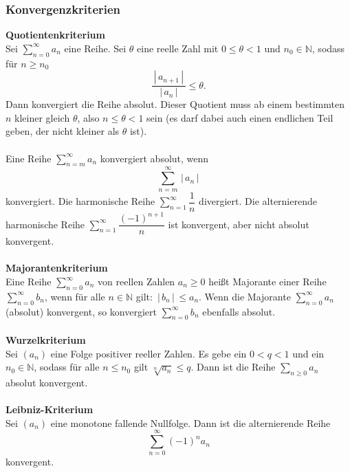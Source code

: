 \documentclass[a4paper,12pt]{article}
\numberwithin{equation}{section}
\begin{document}
\subsubsection{Konvergenzkriterien}
\textbf{Quotientenkriterium}\\ 
Sei $\sum_{n=0}^{\infty}a_n$ eine Reihe. Sei $\theta $ eine reelle Zahl mit $0\leq \theta <1$ und $n_0 \in \mathbb{N}$, sodass für $n\geq n_0$ 
\[ 
        \dfrac{\,|\, a_{n+1}\,|\, }{\,|\, a_n\,|\, }\leq \theta 
.\] 
Dann konvergiert die Reihe absolut. Dieser Quotient muss ab einem bestimmten $n$ kleiner gleich $\theta $, also $n\leq \theta <1$ sein (es darf dabei auch einen endlichen Teil geben, der nicht kleiner als $\theta $ ist).\\\\
Eine Reihe $\sum_{n=m}^{\infty}a_n$ konvergiert absolut, wenn
\[ 
        \sum_{n=m}^{\infty}\,|\, a_n\,|\, 
\] 
konvergiert. Die harmonische Reihe $\sum_{n=1}^{\infty}\dfrac{1}{n}$ divergiert. Die alternierende harmonische Reihe $\sum_{n=1}^{\infty}\dfrac{\left(-1\right)^{n+1}}{n}$ ist konvergent, aber nicht absolut konvergent.
\\\hfill\\\textbf{Majorantenkriterium}\\ 
Eine Reihe $\sum_{n=0}^{\infty}a_n$ von reellen Zahlen $a_n\geq 0$ heißt Majorante einer Reihe $\sum_{n=0}^{\infty}b_n$, wenn für alle $n  \in \mathbb{N}$ gilt: $\,|\, b_n\,|\, \leq a_n$. Wenn die Majorante $\sum_{n=0}^{\infty}a_n$ (absolut) konvergent, so konvergiert $\sum_{n=0}^{\infty}b_n$ ebenfalls absolut.
\\\hfill\\\textbf{Wurzelkriterium}\\ 
Sei $\left(a_n\right)$ eine Folge positiver reeller Zahlen. Es gebe ein $0<q<1$ und ein $n_0  \in \mathbb{N}$, sodass für alle $n\leq n_0$ gilt $\sqrt[n]{a_n}\leq q$. Dann ist die Reihe $\sum_{n\geq 0}^{}a_n$ absolut konvergent.
\\\hfill\\\textbf{Leibniz-Kriterium}\\ 
Sei $\left(a_n\right)$ eine monotone fallende Nullfolge. Dann ist die alternierende Reihe
\[ 
        \sum_{n=0}^{\infty}\left(-1\right)^{n}a_n
\] 
konvergent.
\end{document}
